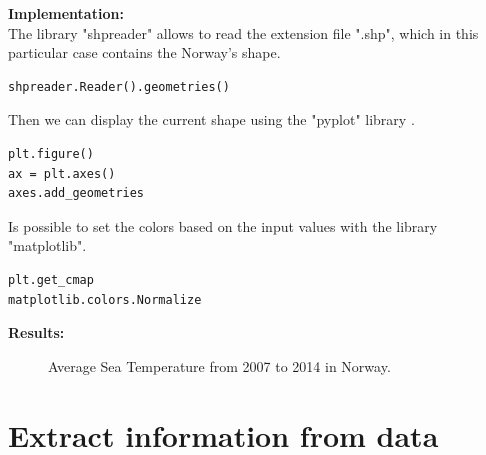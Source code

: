 \newpage

\textbf{Implementation:}\\
The library "shpreader" allows to read the extension file ".shp", which in this particular case contains the Norway's shape.
\begin{lstlisting}
shpreader.Reader().geometries()
\end{lstlisting}

Then we can display the current shape using the "pyplot" library .
\begin{lstlisting}
plt.figure()
ax = plt.axes()
axes.add_geometries
\end{lstlisting}

Is possible to set the colors based on the input values with the library "matplotlib".
\begin{lstlisting}
plt.get_cmap
matplotlib.colors.Normalize
\end{lstlisting}

\textbf{Results:} \\

\begin{figure}[H]
    \caption{Average Sea Temperature from 2007 to 2014 in Norway.}
\end{figure}

\newpage

\section{Extract information from data}
